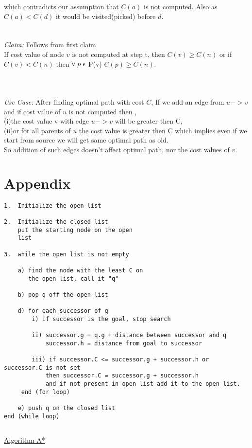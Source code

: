 \documentclass{article}
\begin{document}
which contradicts our assumption that $C(a)$ is not computed. Also as $C(a)< C(d)$ it would be visited(picked) before $d$.
\\
\\
\\
\textit{Claim:} Follows from first claim\\
If cost value of node $v$ is not computed at step t, then $C(v) \geq C(n) $ or if $C(v) < C(n) $ then $\forall \hspace{1mm} p \hspace{1mm} \epsilon $ P(v) $C(p) \geq C(n) $. \\
\\
\\
\\
\textit{Use Case:} After finding optimal path with cost $C$, If we add an edge from $u->v$ and if cost value of $u$ is not computed then ,\\ (i)the cost value v with edge $u->v$ will be greater then C, \\
(ii)or for all parents of $u$ the cost value is greater then C which implies even if we start from source we will get same optimal path as old.\\
So addition of such edges doesn't affect optimal path, nor the cost values of $v$.

\section{Appendix }
\begin{verbatim}
1.  Initialize the open list

2.  Initialize the closed list
    put the starting node on the open 
    list

3.  while the open list is not empty
    
    a) find the node with the least C on 
       the open list, call it "q"

    b) pop q off the open list
  
    d) for each successor of q
        i) if successor is the goal, stop search
         
        ii) successor.g = q.g + distance between successor and q
            successor.h = distance from goal to successor
          
        iii) if successor.C <= successor.g + successor.h or successor.C is not set
            then successor.C = successor.g + successor.h 
            and if not present in open list add it to the open list.
     end (for loop)
  
    e) push q on the closed list
end (while loop) 
    
\end{verbatim}



\href{https://www.geeksforgeeks.org/a-search-algorithm/}{Algorithm A*}
\end{document}
